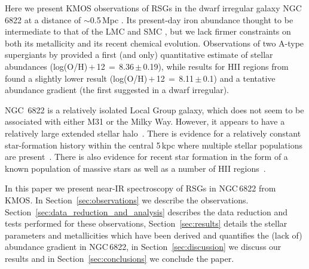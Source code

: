 \documentclass[manuscript]{aastex}
\def\2{\footnotesize II\normalsize}
\begin{document}

Here we present KMOS observations of RSGs in the dwarf irregular galaxy NGC\,6822 at a distance of $\sim$0.5\,Mpc
\cite[see e.g.][]{2003ApJ...588L..85C,2004AJ....128.2815P,2005A&A...429..837C}.
Its present-day iron abundance thought to be intermediate to that of the LMC and SMC
\citep{1999A&A...352L..40M,2006ApJ...647..970L},
but we lack firmer constraints on both its metallicity and its recent chemical evolution.
Observations of two A-type supergiants by
\cite{2001ApJ...547..765V} provided a first (and only) quantitative estimate of stellar abundances
(log(O/H)\,$+$\,12\,$=$\,8.36\,$\pm$\,0.19),
while results for H\2 regions from
\cite{2006ApJ...647..970L} found a slightly lower result
(log(O/H)\,$+$\,12\,$=$\,8.11\,$\pm$\,0.1) and a tentative abundance gradient
(the first suggested in a dwarf irregular).

NGC\, 6822 is a relatively isolated Local Group galaxy, which does not seem to be associated with either M31 or the Milky Way.
However, it appears to have a relatively large extended stellar halo~\citep{2002AJ....123..832L,2014ApJ...783...49H}.
There is evidence for a relatively constant star-formation history within the central 5\,kpc
where multiple stellar populations are present~\citep{2006A&A...451...99B,2012A&A...540A.135S}.
There is also evidence for recent star formation in the form of a known population of massive stars as well as a number of H\2 regions~\citep{2001ApJ...547..765V,2009A&A...505.1027H,Levesque12}.


In this paper we present near-IR spectroscopy of RSGs in NGC\,6822 from KMOS.
In Section~\ref{sec:observations} we describe the observations.
Section~\ref{sec:data_reduction_and_analysis} describes the data reduction and tests performed for these observations,
Section~\ref{sec:results} details the stellar parameters and metallicities which have been derived and quantifies the (lack of) abundance gradient in NGC\,6822, in Section~\ref{sec:discussion} we discuss our results and in
Section~\ref{sec:conclusions} we conclude the paper.
\end{document}
